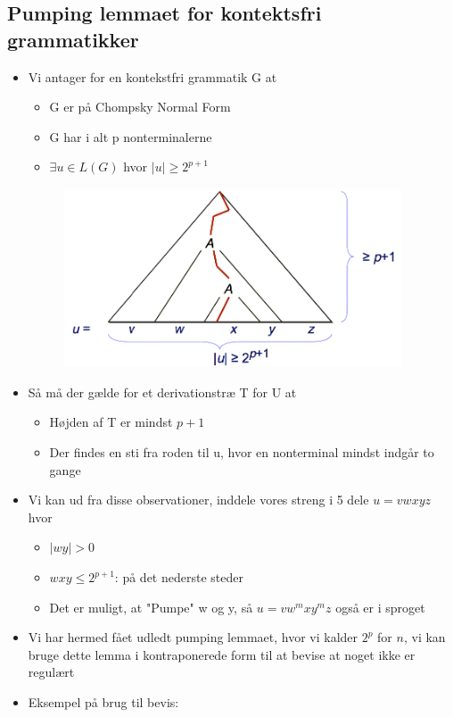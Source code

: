 \documentclass[a4, danish]{article}
\begin{document}
\subsection{Pumping lemmaet for kontektsfri grammatikker}
\begin{itemize}
  \item Vi antager for en kontekstfri grammatik G at
  \begin{itemize}
  	\item G er på Chompsky Normal Form
    \item G har i alt p nonterminalerne
    \item $\exists u \in L(G)$ hvor $|u| \geq 2^{p+1}$
  \end{itemize}
  \begin{figure}[ht]
    \centering
    \includegraphics[width=100mm]{img/Derivationstrae} 
  \end{figure}
  \item Så må der gælde for et derivationstræ T for U at 
  \begin{itemize}
  	\item Højden af T er mindst $p+1$
    \item Der findes en sti fra roden til u, hvor en nonterminal mindst indgår to gange
  \end{itemize}
  \item Vi kan ud fra disse observationer, inddele vores streng i 5 dele $u=vwxyz$ hvor
  \begin{itemize}
  	\item $|wy|>0$
    \item $wxy \leq 2^{p+1}$: på det nederste steder
    \item Det er muligt, at "Pumpe" w og y, så $u=vw^mxy^mz$ også er i sproget 
  \end{itemize}
  \item Vi har hermed fået udledt pumping lemmaet, hvor vi kalder $2^p$ for $n$, vi kan bruge dette lemma i kontraponerede form til at bevise at noget ikke er regulært
  \item Eksempel på brug til bevis:

\end{itemize}
\end{document}
